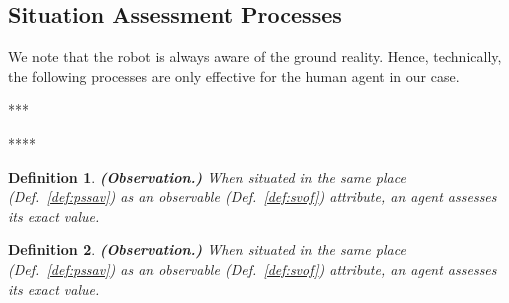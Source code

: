 \documentclass[letterpaper]{article} %
\newtheorem{definition}{Definition}
\begin{document}
\subsection{Situation Assessment Processes}

We note that the robot is always aware of the ground reality. 
Hence, technically, the following processes are only effective for the human agent in our case. 

***

****

\begin{definition} \label{def:obs}
    \textbf{(Observation.)} When situated in the same place (Def.~\ref{def:pssav}) as an observable (Def.~\ref{def:svof}) attribute, an agent assesses its exact value.  
\end{definition}

\begin{definition} \label{def:obs}
    \textbf{(Observation.)} When situated in the same place (Def.~\ref{def:pssav}) as an observable (Def.~\ref{def:svof}) attribute, an agent assesses its exact value.  
\end{definition}



\end{document}
